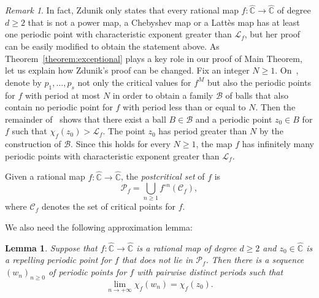 \documentclass[11pt]{article}
\theoremstyle{plain}
\newtheorem{lemma}[theorem]{Lemma}
\theoremstyle{definition}
\theoremstyle{remark}
\newtheorem{remark}[theorem]{Remark}
\begin{document}
\begin{remark}
In fact, Zdunik only states that every rational map $f \colon \widehat{\mathbb{C}} \to \widehat{\mathbb{C}}$ of degree $d \geq 2$ that is not a power map, a Chebyshev map or a Lattès map has at least one periodic point with characteristic exponent greater than $\mathcal{L}_{f}$, but her proof can be easily modified to obtain the statement above. As Theorem~\ref{theorem:exceptional} plays a key role in our proof of Main Theorem, let us explain how Zdunik's proof can be changed. Fix an integer $N \geq 1$. On~\cite[p.\,260]{Z2014}, denote by $p_{1}, \dotsc, p_{s}$ not only the critical values for $f^{M}$ but also the periodic points for $f$ with period at most $N$ in order to obtain a family $\mathcal{B}$ of balls that also contain no periodic point for $f$ with period less than or equal to $N$. Then the remainder of~\cite[Proof of Prop.\,4]{Z2014} shows that there exist a ball $B \in \mathcal{B}$ and a periodic point $z_{0} \in B$ for $f$ such that $\chi_{f}(z_{0}) > \mathcal{L}_{f}$. The point $z_{0}$ has period greater than $N$ by the construction of $\mathcal{B}$. Since this holds for every $N \geq 1$, the map $f$ has infinitely many periodic points with characteristic exponent greater than $\mathcal{L}_{f}$.
\end{remark}

Given a rational map $f \colon \widehat{\mathbb{C}} \to \widehat{\mathbb{C}}$, the \emph{postcritical set} of $f$ is
\[
\mathcal{P}_{f} = \bigcup_{n \geq 1} f^{\circ n}(\mathcal{C}_{f}),
\]
where $\mathcal{C}_{f}$ denotes the set of critical points for $f$.

We also need the following approximation lemma:

\begin{lemma}
\label{lemma:homoclinic}
Suppose that $f \colon \widehat{\mathbb{C}} \to \widehat{\mathbb{C}}$ is a rational map of degree $d \geq 2$ and $z_{0} \in \widehat{\mathbb{C}}$ is a repelling periodic point for $f$ that does not lie in $\mathcal{P}_{f}$. Then there is a sequence $(w_{n})_{n \geq 0}$ of periodic points for $f$ with pairwise distinct periods such that
\[
\lim_{n \to +\infty} \chi_{f}(w_{n}) = \chi_{f}(z_{0}).
\]
\end{lemma}
\end{document}
